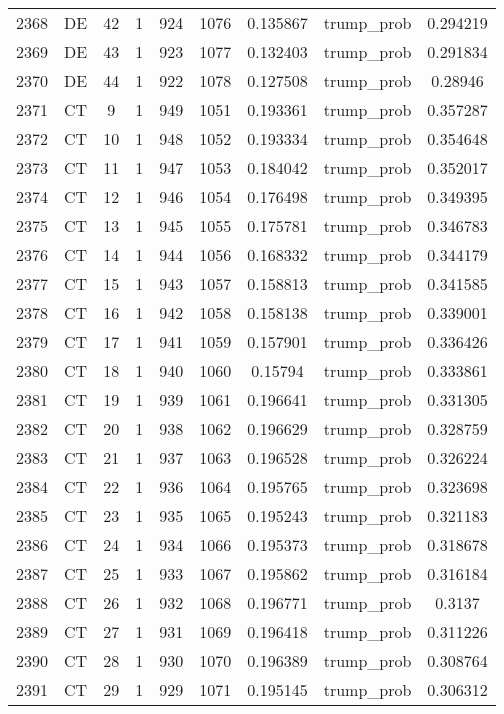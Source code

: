 \documentclass[12pt,a4paper]{article}
\begin{document}
\begin{tabular}{r|cccccccc}
	2368 & DE & 42 & 1 & 924 & 1076 & 0.135867 & trump\_prob & 0.294219 \\
	2369 & DE & 43 & 1 & 923 & 1077 & 0.132403 & trump\_prob & 0.291834 \\
	2370 & DE & 44 & 1 & 922 & 1078 & 0.127508 & trump\_prob & 0.28946 \\
	2371 & CT & 9 & 1 & 949 & 1051 & 0.193361 & trump\_prob & 0.357287 \\
	2372 & CT & 10 & 1 & 948 & 1052 & 0.193334 & trump\_prob & 0.354648 \\
	2373 & CT & 11 & 1 & 947 & 1053 & 0.184042 & trump\_prob & 0.352017 \\
	2374 & CT & 12 & 1 & 946 & 1054 & 0.176498 & trump\_prob & 0.349395 \\
	2375 & CT & 13 & 1 & 945 & 1055 & 0.175781 & trump\_prob & 0.346783 \\
	2376 & CT & 14 & 1 & 944 & 1056 & 0.168332 & trump\_prob & 0.344179 \\
	2377 & CT & 15 & 1 & 943 & 1057 & 0.158813 & trump\_prob & 0.341585 \\
	2378 & CT & 16 & 1 & 942 & 1058 & 0.158138 & trump\_prob & 0.339001 \\
	2379 & CT & 17 & 1 & 941 & 1059 & 0.157901 & trump\_prob & 0.336426 \\
	2380 & CT & 18 & 1 & 940 & 1060 & 0.15794 & trump\_prob & 0.333861 \\
	2381 & CT & 19 & 1 & 939 & 1061 & 0.196641 & trump\_prob & 0.331305 \\
	2382 & CT & 20 & 1 & 938 & 1062 & 0.196629 & trump\_prob & 0.328759 \\
	2383 & CT & 21 & 1 & 937 & 1063 & 0.196528 & trump\_prob & 0.326224 \\
	2384 & CT & 22 & 1 & 936 & 1064 & 0.195765 & trump\_prob & 0.323698 \\
	2385 & CT & 23 & 1 & 935 & 1065 & 0.195243 & trump\_prob & 0.321183 \\
	2386 & CT & 24 & 1 & 934 & 1066 & 0.195373 & trump\_prob & 0.318678 \\
	2387 & CT & 25 & 1 & 933 & 1067 & 0.195862 & trump\_prob & 0.316184 \\
	2388 & CT & 26 & 1 & 932 & 1068 & 0.196771 & trump\_prob & 0.3137 \\
	2389 & CT & 27 & 1 & 931 & 1069 & 0.196418 & trump\_prob & 0.311226 \\
	2390 & CT & 28 & 1 & 930 & 1070 & 0.196389 & trump\_prob & 0.308764 \\
	2391 & CT & 29 & 1 & 929 & 1071 & 0.195145 & trump\_prob & 0.306312 \\

\end{tabular}
\end{document}
